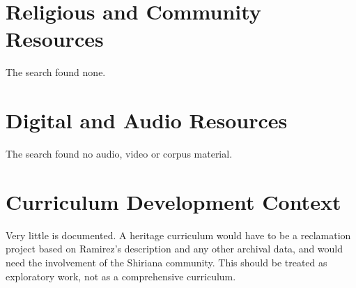 \documentclass[12pt]{article}
\begin{document}
\section{Religious and Community Resources}
The search found none.

\section{Digital and Audio Resources}
The search found no audio, video or corpus material.

\section{Curriculum Development Context}
Very little is documented. A heritage curriculum would have to be a reclamation project based on Ramirez's description and any other archival data, and would need the involvement of the Shiriana community. This should be treated as exploratory work, not as a comprehensive curriculum.
\end{document}
